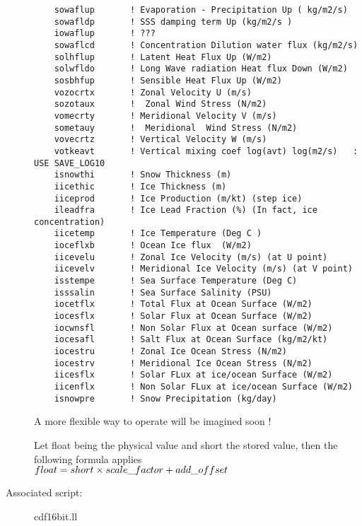 \documentclass[a4paper,11pt]{article}
\begin{document}
\begin{description}
\begin{small}
\begin{verbatim}
    sowaflup       ! Evaporation - Precipitation Up ( kg/m2/s)
    sowafldp       ! SSS damping term Up (kg/m2/s )
    iowaflup       ! ???
    sowaflcd       ! Concentration Dilution water flux (kg/m2/s)
    solhflup       ! Latent Heat Flux Up (W/m2)
    solwfldo       ! Long Wave radiation Heat flux Down (W/m2)
    sosbhfup       ! Sensible Heat Flux Up (W/m2)
    vozocrtx       ! Zonal Velocity U (m/s)
    sozotaux       !  Zonal Wind Stress (N/m2)
    vomecrty       ! Meridional Velocity V (m/s)
    sometauy       !  Meridional  Wind Stress (N/m2)
    vovecrtz       ! Vertical Velocity W (m/s)
    votkeavt       ! Vertical mixing coef log(avt) log(m2/s)   : USE SAVE_LOG10 
    isnowthi       ! Snow Thickness (m)
    iicethic       ! Ice Thickness (m)
    iiceprod       ! Ice Production (m/kt) (step ice)
    ileadfra       ! Ice Lead Fraction (%) (In fact, ice concentration)
    iicetemp       ! Ice Temperature (Deg C )
    ioceflxb       ! Ocean Ice flux  (W/m2)
    iicevelu       ! Zonal Ice Velocity (m/s) (at U point)
    iicevelv       ! Meridional Ice Velocity (m/s) (at V point)
    isstempe       ! Sea Surface Temperature (Deg C)
    isssalin       ! Sea Surface Salinity (PSU)
    iocetflx       ! Total Flux at Ocean Surface (W/m2)
    iocesflx       ! Solar Flux at Ocean Surface (W/m2)
    iocwnsfl       ! Non Solar Flux at Ocean surface (W/m2)
    iocesafl       ! Salt Flux at Ocean Surface (kg/m2/kt)
    iocestru       ! Zonal Ice Ocean Stress (N/m2)
    iocestrv       ! Meridional Ice Ocean Stress (N/m2)
    iicesflx       ! Solar FLux at ice/ocean Surface (W/m2)
    iicenflx       ! Non Solar FLux at ice/ocean Surface (W/m2)
    isnowpre       ! Snow Precipitation (kg/day)
  \end{verbatim}
 \end{small}
     A more flexible way to operate will be imagined soon !

Let float being the physical value and short the stored value, then the following formula applies \\
       $ float = short \times scale\_factor + add\_offset $ 
\item[Associated script:] cdf16bit.ll
\end{description}
\end{document}
